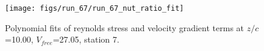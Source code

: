 \begin{figure}[H]
\centering
\texttt{[image: figs/run\_67/run\_67\_nut\_ratio\_fit]}
\caption{Polynomial fits of reynolds stress and velocity gradient terms at $z/c$=10.00, $V_{free}$=27.05, station 7.}
\label{fig:run_67_nut_ratio_fit}
\end{figure}


